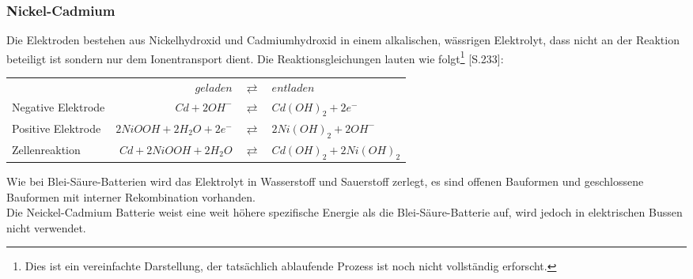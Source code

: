 \subsubsection{Nickel-Cadmium} %
Die Elektroden bestehen aus Nickelhydroxid und Cadmiumhydroxid in einem alkalischen, wässrigen Elektrolyt, dass nicht an der Reaktion beteiligt ist sondern nur dem Ionentransport dient. Die Reaktionsgleichungen lauten wie folgt\footnote{Dies ist ein vereinfachte Darstellung, der tatsächlich ablaufende Prozess ist noch nicht vollständig erforscht.} \cite{Sterner:2014}[S.233]:
\begin{table*}[htbp]
  \begin{tabularx}{\linewidth}{XrcX}
  	                   &                       $geladen$ & $\rightleftarrows$ & $entladen$            \\
  	Negative Elektrode & $Cd + 2OH^-$ & $\rightleftarrows$ & $Cd(OH)_2 + 2e^-$       \\
  	Positive Elektrode &                  $2NiOOH + 2H_2O + 2e^-$ & $\rightleftarrows$ & $2Ni(OH)_2 + 2OH^-$ \\ \midrule
  	Zellenreaktion     &         $Cd + 2NiOOH + 2H_2O$ & $\rightleftarrows$ & $Cd(OH)_2 + 2Ni(OH)_2$
  \end{tabularx}
\end{table*}
Wie bei Blei-Säure-Batterien wird das Elektrolyt in Wasserstoff und Sauerstoff zerlegt, es sind offenen Bauformen und geschlossene Bauformen mit interner Rekombination vorhanden.\\
Die Neickel-Cadmium Batterie weist eine weit höhere spezifische Energie als die Blei-Säure-Batterie auf, wird jedoch in elektrischen Bussen nicht verwendet.

